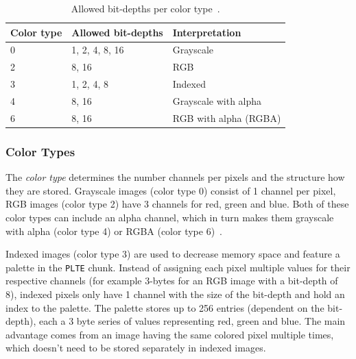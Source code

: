 \documentclass[runningheads]{llncs}
\begin{document}
\bgroup
\def\arraystretch{1.5}
\setlength\tabcolsep{1.5ex}
    \begin{table}[]
        \caption{Allowed bit-depths per color type~\cite{libpng_chunks}.}
        \label{tab2}
        \begin{center}
            \begin{tabular}{|l|l|l|}
            \hline
            \textbf{Color type} & \textbf{Allowed bit-depths} & \textbf{Interpretation} \\ \hline \hline 
            0                   & 1, 2, 4, 8, 16              & Grayscale               \\ \hline
            2                   & 8, 16                       & RGB                     \\ \hline
            3                   & 1, 2, 4, 8                  & Indexed                 \\ \hline
            4                   & 8, 16                       & Grayscale with alpha    \\ \hline
            6                   & 8, 16                       & RGB with alpha (RGBA)   \\ \hline
            \end{tabular}
        \end{center}
    \end{table}
\egroup

\subsubsection{Color Types}
The \textit{color type} determines the number channels per pixels and the structure how they are stored. Grayscale images (color type 0) consist of 1 channel per pixel, RGB images (color type 2) have 3 channels for red, green and blue. 
Both of these color types can include an alpha channel, which in turn makes them grayscale with alpha (color type 4) or RGBA (color type 6)~\cite{libpng_data_representation}.

Indexed images (color type 3) are used to decrease memory space and feature a palette in the \texttt{PLTE} chunk.
Instead of assigning each pixel multiple values for their respective channels (for example 3-bytes for an RGB image with a bit-depth of 8), indexed pixels only have 1 channel with the size of the bit-depth and hold an index to the palette.
The palette stores up to 256 entries (dependent on the bit-depth), each a 3 byte series of values representing red, green and blue. The main advantage comes from an image having the same colored pixel multiple times, which doesn't need to be stored separately in indexed images.
\end{document}
